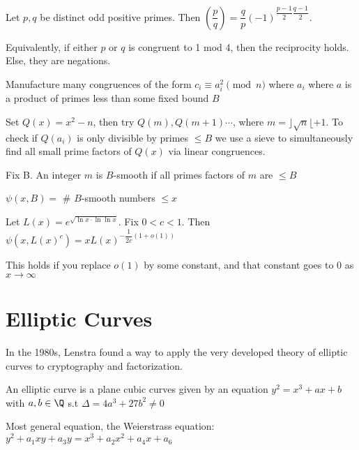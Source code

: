 \documentclass[twoside, 10pt]{article}
\begin{document}
\begin{defn}
    Let $p, q$ be distinct odd positive primes. Then $\left(\dfrac{p}{q}\right) = \dfrac{q}{p}(-1)^{\dfrac{p-1}{2}\dfrac{q-1}{2}}$.
\end{defn}
Equivalently, if either $p$ or $q$ is congruent to 1 mod 4, then the reciprocity holds. Else, they are negations.
\begin{defn} 
    
\end{defn}
Manufacture many congruences of the form $c_i \equiv a_i^2 \pmod{n}$ where $a_i$ where $a$ is a product of primes less than some fixed bound $B$

Set $Q(x) = x^2 - n$, then try $Q(m), Q(m + 1) \cdots$, where $m = \rfloor\sqrt n \lfloor + 1$. To check if $Q(a_i)$ is only divisible by primes $\leq B$ we use a sieve to simultaneously find all small prime factors of $Q(x)$ via linear congruences. 

\begin{defn}
    Fix B. An integer $m$ is $B$-smooth if all primes factors of $m$ are $\leq B$
\end{defn}

\begin{defn}
    $\psi(x, B) = $ \# $B$-smooth numbers $\leq x$
\end{defn}

\begin{thm}
    Let $L(x) = e^{\sqrt{\ln x \cdot \ln\ln x}}$. Fix $0 < c < 1$. Then $\psi(x, L(x)^c) = xL(x)^{-\dfrac{1}{2c}(1 + o(1))}$
\end{thm}
This holds if you replace $o(1)$ by some constant, and that constant goes to 0 as $x\to\infty$

\section{Elliptic Curves}
In the 1980s, Lenstra found a way to apply the very developed theory of elliptic curves to cryptography and factorization. 

\begin{defn}
    An elliptic curve is a plane cubic curves given by an equation $y^2 = x^3 + ax + b$ with $a, b \in \Q$ s.t $\Delta = 4a^3 + 27b^2 \neq 0$
\end{defn}

\begin{rmk}
    Most general equation, the Weierstrass equation: $y^2 + a_1xy + a_3y = x^3 + a_2x^2 + a_4x + a_6$
\end{rmk}
\end{document}
